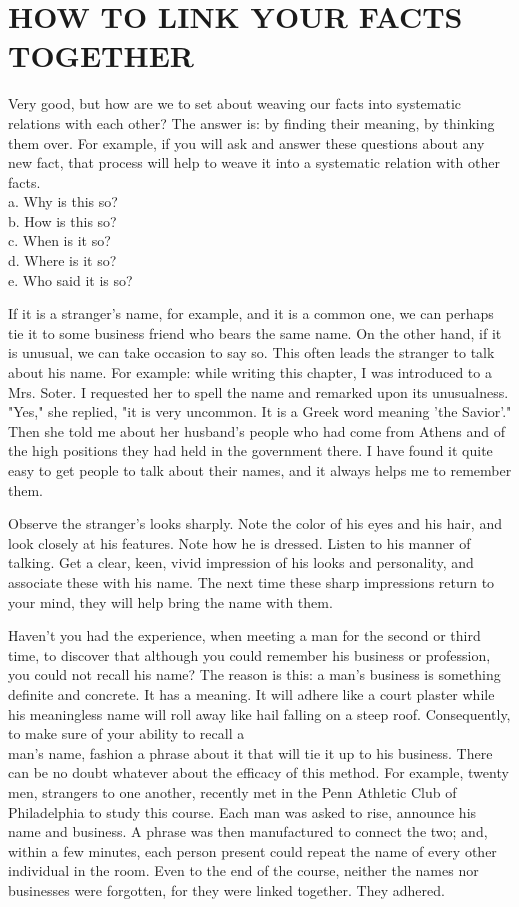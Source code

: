 \documentclass[10pt]{article}
\begin{document}
\section*{HOW TO LINK YOUR FACTS TOGETHER}
Very good, but how are we to set about weaving our facts into systematic relations with each other? The answer is: by finding their meaning, by thinking them over. For example, if you will ask and answer these questions about any new fact, that process will help to weave it into a systematic relation with other facts.\\
a. Why is this so?\\
b. How is this so?\\
c. When is it so?\\
d. Where is it so?\\
e. Who said it is so?

If it is a stranger's name, for example, and it is a common one, we can perhaps tie it to some business friend who bears the same name. On the other hand, if it is unusual, we can take occasion to say so. This often leads the stranger to talk about his name. For example: while writing this chapter, I was introduced to a Mrs. Soter. I requested her to spell the name and remarked upon its unusualness. "Yes," she replied, "it is very uncommon. It is a Greek word meaning 'the Savior'." Then she told me about her husband's people who had come from Athens and of the high positions they had held in the government there. I have found it quite easy to get people to talk about their names, and it always helps me to remember them.

Observe the stranger's looks sharply. Note the color of his eyes and his hair, and look closely at his features. Note how he is dressed. Listen to his manner of talking. Get a clear, keen, vivid impression of his looks and personality, and associate these with his name. The next time these sharp impressions return to your mind, they will help bring the name with them.

Haven't you had the experience, when meeting a man for the second or third time, to discover that although you could remember his business or profession, you could not recall his name? The reason is this: a man's business is something definite and concrete. It has a meaning. It will adhere like a court plaster while his meaningless name will roll away like hail falling on a steep roof. Consequently, to make sure of your ability to recall a\\
man's name, fashion a phrase about it that will tie it up to his business. There can be no doubt whatever about the efficacy of this method. For example, twenty men, strangers to one another, recently met in the Penn Athletic Club of Philadelphia to study this course. Each man was asked to rise, announce his name and business. A phrase was then manufactured to connect the two; and, within a few minutes, each person present could repeat the name of every other individual in the room. Even to the end of the course, neither the names nor businesses were forgotten, for they were linked together. They adhered.
\end{document}

